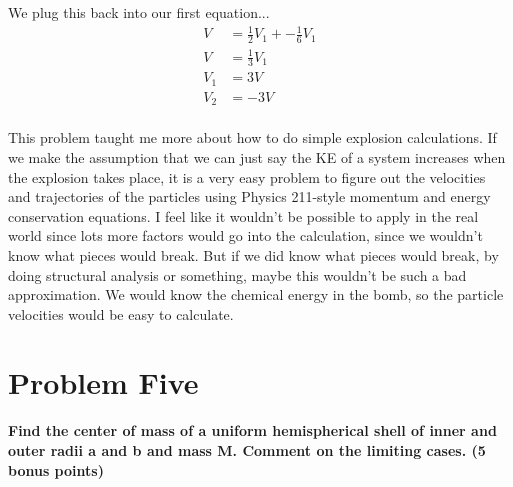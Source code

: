 \documentclass[10pt]{article} %
\begin{document}
We plug this back into our first equation...\\

\begin{align*}
  V &= \frac{1}{2}V_1 + -\frac{1}{6}V_1\\
  V &= \frac{1}{3}V_1\\
  V_1 &= 3V\\
  V_2 &= -3V\\
\end{align*}

This problem taught me more about how to do simple explosion calculations. If we make the assumption that we can just say the KE of a system increases when the explosion takes place, it is a very easy problem to figure out the velocities and trajectories of the particles using Physics 211-style momentum and energy conservation equations. I feel like it wouldn't be possible to apply in the real world since lots more factors would go into the calculation, since we wouldn't know what pieces would break. But if we did know what pieces would break, by doing structural analysis or something, maybe this wouldn't be such a bad approximation. We would know the chemical energy in the bomb, so the particle velocities would be easy to calculate.\\

\section{Problem Five}
\textbf{Find the center of mass of a uniform hemispherical shell of inner and outer radii a and b and mass M. Comment on the limiting cases. (5 bonus points)} \\ \\
\vspace{1 cm}
\end{document}
